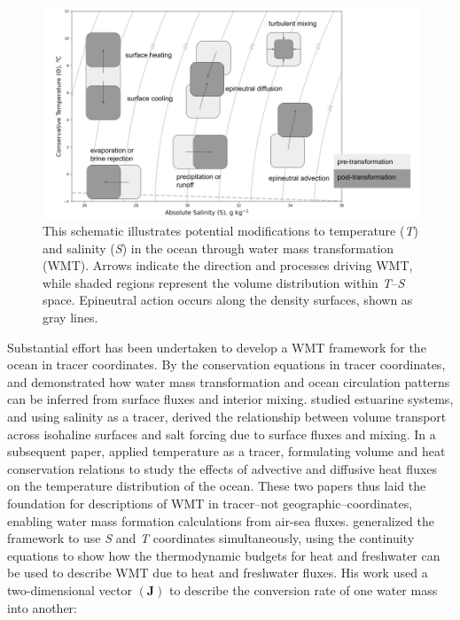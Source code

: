 \documentclass[draft]{agujournal2019}
\begin{document}
\begin{figure}
    \includegraphics[width=\linewidth]{figs/TS_example.png}
    \vspace{-5pt} %
    \caption{This schematic illustrates potential modifications to temperature (\emph{T}) and salinity (\emph{S}) in the ocean through water mass transformation (WMT). Arrows indicate the direction and processes driving WMT, while shaded regions represent the volume distribution within \emph{T}--\emph{S} space. Epineutral action occurs along the density surfaces, shown as gray lines.}
    \label{fig:TS_example}
    \vspace{-20pt}
\end{figure}

Substantial effort has been undertaken to develop a WMT framework for the ocean in tracer coordinates. By the conservation equations in tracer coordinates,  and  demonstrated how water mass transformation and ocean circulation patterns can be inferred from surface fluxes and interior mixing.  studied estuarine systems, and using salinity as a tracer, derived the relationship between volume transport across isohaline surfaces and salt forcing due to surface fluxes and mixing. In a subsequent paper,  applied temperature as a tracer, formulating volume and heat conservation relations to study the effects of advective and diffusive heat fluxes on the temperature distribution of the ocean. These two papers thus laid the foundation for descriptions of WMT in tracer--not geographic--coordinates, enabling water mass formation calculations from air-sea fluxes.  generalized the  framework to use \emph{S} and \emph{T} coordinates simultaneously, using the continuity equations to show how the thermodynamic budgets for heat and freshwater can be used to describe WMT due to heat and freshwater fluxes. His work used a two-dimensional vector $(\mathbf{J})$ to describe the conversion rate of one water mass into another:
\end{document}
